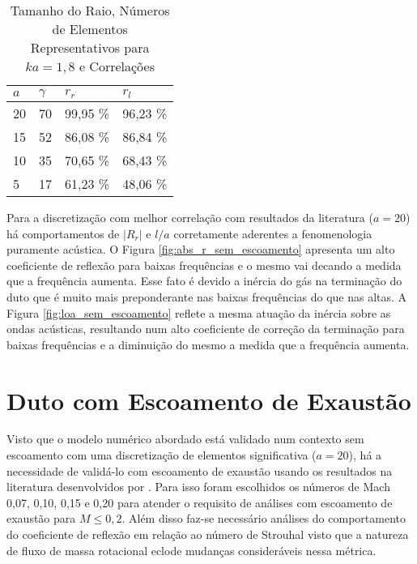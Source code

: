 \begin{table}[ht!]
\centering
\caption{Tamanho do Raio, Números de Elementos Representativos para $ka = 1,8$ e Correlações}
\label{table:discretizacao}
    \begin{tabular}{|l|l|l|l|}
        \hline
        $a$ & $\gamma$ & $r_r$ & $r_l$ \\ \hline
        20  & 70 & 99,95 \%  & 96,23 \%  \\ \hline
        15  & 52 &  86,08 \% & 86,84 \% \\ \hline
        10  & 35 &  70,65 \% & 68,43 \% \\ \hline
        5   & 17 &  61,23 \% & 48,06 \%  \\
        \hline
    \end{tabular}
\end{table}

Para a discretização com melhor correlação com resultados da literatura ($a = 20$) há comportamentos de $|R_{r}|$ e $l/a$ corretamente aderentes a fenomenologia puramente acústica. O Figura \ref{fig:abs_r_sem_escoamento} apresenta um alto coeficiente de reflexão para baixas frequências e o mesmo vai decando a medida que a frequência aumenta. Esse fato é devido a inércia do gás na terminação do duto que é muito mais preponderante nas baixas frequências do que nas altas. A Figura \ref{fig:loa_sem_escoamento} reflete a mesma atuação da inércia sobre as ondas acústicas, resultando num alto coeficiente de correção da terminação para baixas frequências e a diminuição do mesmo a medida que a frequência aumenta.       



















\section{Duto com Escoamento de Exaustão}

Visto que o modelo numérico abordado está validado num contexto sem escoamento com uma discretização de elementos significativa ($a = 20$), há a necessidade de validá-lo com escoamento de exaustão usando os resultados na literatura desenvolvidos por . Para isso foram escolhidos os números de Mach 0,07, 0,10, 0,15 e 0,20 para atender o requisito de  análises com escoamento de exaustão para $M \leq 0,2$. Além disso faz-se necessário análises do comportamento do coeficiente de reflexão em relação ao número de Strouhal visto que a natureza de fluxo de massa rotacional eclode mudanças consideráveis nessa métrica.       

